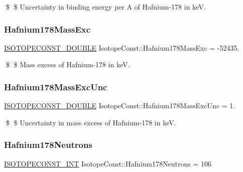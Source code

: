 \$ \$ Uncertainty in binding energy per A of Hafnium-\/178 in keV. \mbox{\label{group___isotope_const-_hafnium-_hf178_ga1d1aed7b2143bde015c952f37aa618b4}} 
\subsubsection{\texorpdfstring{Hafnium178\+Mass\+Exc}{Hafnium178MassExc}}
{\footnotesize\ttfamily \mbox{\hyperlink{group___isotope_const-_macros_ga8f45a7272ce02c0b4c65c44636ed719a}{I\+S\+O\+T\+O\+P\+E\+C\+O\+N\+S\+T\+\_\+\+D\+O\+U\+B\+LE}} Isotope\+Const\+::\+Hafnium178\+Mass\+Exc = -\/52435.}

\$ \$ Mass excess of Hafnium-\/178 in keV. \mbox{\label{group___isotope_const-_hafnium-_hf178_gaaac7674e1dd055e4701fb5e870f69b46}} 
\subsubsection{\texorpdfstring{Hafnium178\+Mass\+Exc\+Unc}{Hafnium178MassExcUnc}}
{\footnotesize\ttfamily \mbox{\hyperlink{group___isotope_const-_macros_ga8f45a7272ce02c0b4c65c44636ed719a}{I\+S\+O\+T\+O\+P\+E\+C\+O\+N\+S\+T\+\_\+\+D\+O\+U\+B\+LE}} Isotope\+Const\+::\+Hafnium178\+Mass\+Exc\+Unc = 1.}

\$ \$ Uncertainty in mass excess of Hafnium-\/178 in keV. \mbox{\label{group___isotope_const-_hafnium-_hf178_ga649bd46cdba63a0c22c6afa796c7c228}} 
\subsubsection{\texorpdfstring{Hafnium178\+Neutrons}{Hafnium178Neutrons}}
{\footnotesize\ttfamily \mbox{\hyperlink{group___isotope_const-_macros_ga5f18360b3e99483a35c32d789e62621c}{I\+S\+O\+T\+O\+P\+E\+C\+O\+N\+S\+T\+\_\+\+I\+NT}} Isotope\+Const\+::\+Hafnium178\+Neutrons = 106}

